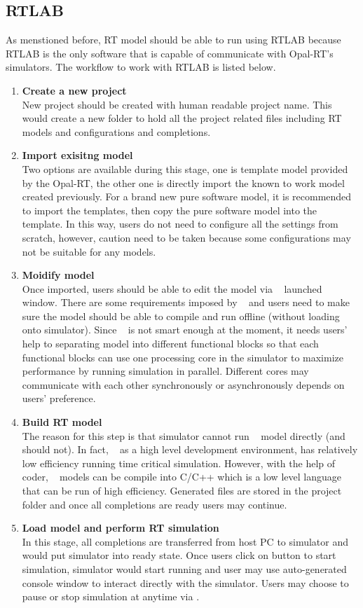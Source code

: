 \subsection{RTLAB}
As menstioned before, \gls{RT} model should be able to run using RTLAB because RTLAB is the only software that is capable of communicate with Opal-RT's simulators. The workflow to work with RTLAB is listed below. 
\begin{enumerate}
\item \textbf{Create a new project} \\
New project should be created with human readable project name. This would create a new folder to hold all the project related files including \gls{RT} models and configurations and completions. 
\item \textbf{Import exisitng model} \\
Two options are available during this stage, one is template model provided by the Opal-RT, the other one is directly import the known to work model created previously. For a brand new pure software model, it is recommended  to import the templates, then copy the pure software model into the template. In this way, users do not need to configure all the settings from scratch, however, caution need to be taken because some configurations may not be suitable for any models. 
\item \textbf{Moidify model} \\
Once imported, users should be able to edit the model via \rtlab~ launched \matlab~ window. There are some requirements imposed by \rtlab~ and users need to make sure the model should be able to compile and run offline (without loading onto simulator). Since \rtlab~ is not smart enough at the moment, it needs users' help to separating model into different functional blocks so that each functional blocks can use one processing core in the simulator to maximize performance by running simulation in parallel. Different cores may communicate with each other synchronously or asynchronously depends on users' preference. 
\item \textbf{Build \gls{RT} model} \\
The reason for this step is that simulator cannot run \matlab~ model directly (and should not). In fact, \simulink~ as a high level development environment, has relatively low efficiency running time critical simulation. However, with the help of \matlab~ coder, \simulink~ models can be compile into C/C++ which is a low level language that can be run of high efficiency. Generated files are stored in the project folder and once all completions are ready users may continue. 
\item \textbf{Load model and perform \gls{RT} simulation} \\
In this stage, all completions are transferred from host PC to simulator and \rtlab~ would put simulator into ready state. Once users click on button to start simulation, simulator would start running and user may use auto-generated console window to interact directly with the simulator. Users may choose to pause or stop simulation at anytime via \rtlab.
\end{enumerate}
